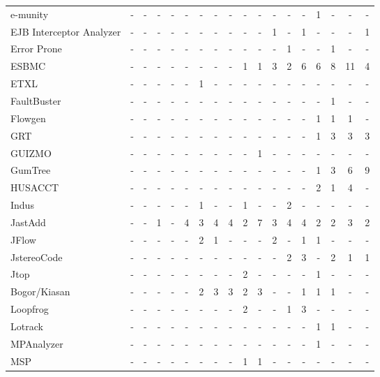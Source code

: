 \begin{longtable}{ l *{17}{c} }
    e-munity & - & - & - & - & - & - & - & - & - & - & - & - & - & 1 & - & - & - \\
    EJB Interceptor Analyzer & - & - & - & - & - & - & - & - & - & - & 1 & - & 1 & - & - & - & 1 \\
    Error Prone & - & - & - & - & - & - & - & - & - & - & - & 1 & - & - & 1 & - & - \\
    ESBMC & - & - & - & - & - & - & - & - & 1 & 1 & 3 & 2 & 6 & 6 & 8 & 11 & 4 \\
    ETXL & - & - & - & - & - & 1 & - & - & - & - & - & - & - & - & - & - & - \\
    FaultBuster & - & - & - & - & - & - & - & - & - & - & - & - & - & - & 1 & - & - \\
    Flowgen & - & - & - & - & - & - & - & - & - & - & - & - & - & 1 & 1 & 1 & - \\
    GRT & - & - & - & - & - & - & - & - & - & - & - & - & - & 1 & 3 & 3 & 3 \\
    GUIZMO & - & - & - & - & - & - & - & - & - & 1 & - & - & - & - & - & - & - \\
    GumTree & - & - & - & - & - & - & - & - & - & - & - & - & - & 1 & 3 & 6 & 9 \\
    HUSACCT & - & - & - & - & - & - & - & - & - & - & - & - & - & 2 & 1 & 4 & - \\
    Indus & - & - & - & - & - & 1 & - & - & 1 & - & - & 2 & - & - & - & - & - \\
    JastAdd & - & - & 1 & - & 4 & 3 & 4 & 4 & 2 & 7 & 3 & 4 & 4 & 2 & 2 & 3 & 2 \\
    JFlow & - & - & - & - & - & 2 & 1 & - & - & - & 2 & - & 1 & 1 & - & - & - \\
    JstereoCode & - & - & - & - & - & - & - & - & - & - & - & 2 & 3 & - & 2 & 1 & 1 \\
    Jtop & - & - & - & - & - & - & - & - & 2 & - & - & - & - & 1 & - & - & - \\
    Bogor/Kiasan & - & - & - & - & - & 2 & 3 & 3 & 2 & 3 & - & - & 1 & 1 & 1 & - & - \\
    Loopfrog & - & - & - & - & - & - & - & - & 2 & - & - & 1 & 3 & - & - & - & - \\
    Lotrack & - & - & - & - & - & - & - & - & - & - & - & - & - & 1 & 1 & - & - \\
    MPAnalyzer & - & - & - & - & - & - & - & - & - & - & - & - & - & 1 & - & - & - \\
    MSP & - & - & - & - & - & - & - & - & 1 & 1 & - & - & - & - & - & - & - \\

\end{longtable}
